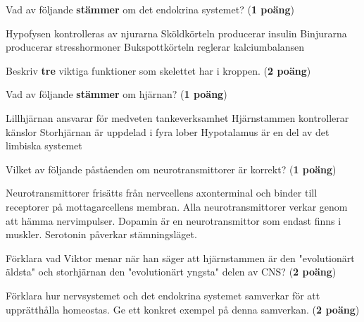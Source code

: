 \documentclass{exam}
\begin{document}
\begin{questions}
\question Vad av följande \textbf{stämmer} om det endokrina systemet? (\textbf{1 poäng})
\begin{checkboxes}
    \choice Hypofysen kontrolleras av njurarna
    \choice Sköldkörteln producerar insulin
    \choice Binjurarna producerar stresshormoner
    \choice Bukspottkörteln reglerar kalciumbalansen
\end{checkboxes}

\vspace{5mm}
\question Beskriv \textbf{tre} viktiga funktioner som skelettet har i kroppen. (\textbf{2 poäng})
\vspace{40mm}

\question Vad av följande \textbf{stämmer} om hjärnan? (\textbf{1 poäng})
\begin{checkboxes}
    \choice Lillhjärnan ansvarar för medveten tankeverksamhet
    \choice Hjärnstammen kontrollerar känslor
    \choice Storhjärnan är uppdelad i fyra lober
    \choice Hypotalamus är en del av det limbiska systemet
\end{checkboxes}
\vspace{5mm}

\question Vilket av följande påståenden om neurotransmittorer är korrekt? (\textbf{1 poäng})
\begin{checkboxes}
    \choice Neurotransmittorer frisätts från nervcellens axonterminal och binder till receptorer på mottagarcellens membran.
    \choice Alla neurotransmittorer verkar genom att hämma nervimpulser.
    \choice Dopamin är en neurotransmittor som endast finns i muskler.
    \choice Serotonin påverkar stämningsläget.
\end{checkboxes}


\break

\vspace{5mm} %
\begin{center}
\end{center}

\question
Förklara vad Viktor menar när han säger att hjärnstammen är den "evolutionärt äldsta" och storhjärnan den "evolutionärt yngsta" delen av CNS? (\textbf{2 poäng})
\vspace{60mm}

\question
Förklara hur nervsystemet och det endokrina systemet samverkar för att upprätthålla homeostas. Ge ett konkret exempel på denna samverkan. (\textbf{2 poäng})


\end{questions}
\end{document}

